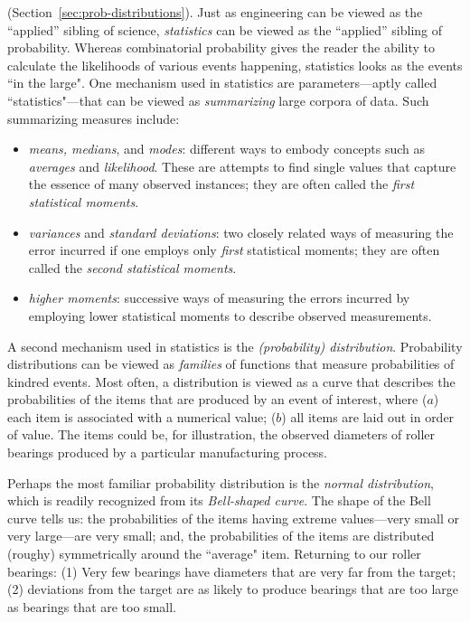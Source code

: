 \medskip


 (Section~\ref{sec:prob-distributions}).
Just as engineering can be viewed as the ``applied'' sibling of science, {\it statistics} can be viewed as the ``applied'' sibling of probability.  Whereas combinatorial probability gives the reader the ability to calculate the likelihoods of various events happening, statistics looks as the events ``in the large".  One mechanism used in statistics are parameters---aptly called ``statistics"---that can be viewed as {\em summarizing} large corpora of data.  Such summarizing measures include:
\begin{itemize}
\item
{\em means, medians}, and {\em modes}: different ways to embody concepts such as {\em averages} and {\em likelihood}.  These are attempts to find single values that capture the essence of many observed instances; they are often called the {\it first statistical moments}.
 
\medskip\item
{\em variances} and {\em standard deviations}: two closely related ways of measuring the error incurred if one employs only {\em first} statistical moments; they are often called the {\it second statistical moments}.
\medskip\item
{\em higher moments}: successive ways of measuring the errors incurred by employing lower statistical moments to describe observed measurements.
\end{itemize}
A second mechanism used in statistics is the {\em (probability) distribution}.  Probability distributions can be viewed as {\em families} of functions that measure probabilities of kindred events.  Most often, a distribution is viewed as a curve that describes the probabilities of the items that are produced by an event of interest, where ($a$) each item is associated with a numerical value; ($b$) all items are laid out in order of value.  The items could be, for illustration, the observed diameters of roller bearings produced by a particular manufacturing process.

Perhaps the most familiar probability distribution is the {\it normal distribution}, which is readily recognized from its {\it Bell-shaped curve}.  The shape of the Bell curve tells us: the probabilities of the items having extreme values---very small or very large---are very small; and, the probabilities of the items are distributed (roughy) symmetrically around the ``average" item.  Returning to our roller bearings: (1) Very few bearings have diameters that are very far from the target; (2) deviations from the target are as likely to produce bearings that are too large as bearings that are too small.

